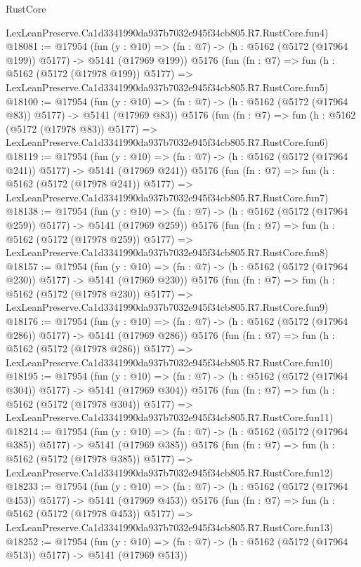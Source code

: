 \begin{lexlean}{RustCore}
\begin{coremodule}
    LexLeanPreserve.Ca1d3341990da937b7032e945f34cb805.R7.RustCore.fun4)
@18081 := @17954
    (fun (y : @10) => (fn : @7) -> (h : @5162 (@5172 (@17964 @199)) @5177) -> @5141 (@17969 @199))
    @5176
    (fun (fn : @7) =>
    fun (h : @5162 (@5172 (@17978 @199)) @5177) =>
    LexLeanPreserve.Ca1d3341990da937b7032e945f34cb805.R7.RustCore.fun5)
@18100 := @17954
    (fun (y : @10) => (fn : @7) -> (h : @5162 (@5172 (@17964 @83)) @5177) -> @5141 (@17969 @83))
    @5176
    (fun (fn : @7) =>
    fun (h : @5162 (@5172 (@17978 @83)) @5177) =>
    LexLeanPreserve.Ca1d3341990da937b7032e945f34cb805.R7.RustCore.fun6)
@18119 := @17954
    (fun (y : @10) => (fn : @7) -> (h : @5162 (@5172 (@17964 @241)) @5177) -> @5141 (@17969 @241))
    @5176
    (fun (fn : @7) =>
    fun (h : @5162 (@5172 (@17978 @241)) @5177) =>
    LexLeanPreserve.Ca1d3341990da937b7032e945f34cb805.R7.RustCore.fun7)
@18138 := @17954
    (fun (y : @10) => (fn : @7) -> (h : @5162 (@5172 (@17964 @259)) @5177) -> @5141 (@17969 @259))
    @5176
    (fun (fn : @7) =>
    fun (h : @5162 (@5172 (@17978 @259)) @5177) =>
    LexLeanPreserve.Ca1d3341990da937b7032e945f34cb805.R7.RustCore.fun8)
@18157 := @17954
    (fun (y : @10) => (fn : @7) -> (h : @5162 (@5172 (@17964 @230)) @5177) -> @5141 (@17969 @230))
    @5176
    (fun (fn : @7) =>
    fun (h : @5162 (@5172 (@17978 @230)) @5177) =>
    LexLeanPreserve.Ca1d3341990da937b7032e945f34cb805.R7.RustCore.fun9)
@18176 := @17954
    (fun (y : @10) => (fn : @7) -> (h : @5162 (@5172 (@17964 @286)) @5177) -> @5141 (@17969 @286))
    @5176
    (fun (fn : @7) =>
    fun (h : @5162 (@5172 (@17978 @286)) @5177) =>
    LexLeanPreserve.Ca1d3341990da937b7032e945f34cb805.R7.RustCore.fun10)
@18195 := @17954
    (fun (y : @10) => (fn : @7) -> (h : @5162 (@5172 (@17964 @304)) @5177) -> @5141 (@17969 @304))
    @5176
    (fun (fn : @7) =>
    fun (h : @5162 (@5172 (@17978 @304)) @5177) =>
    LexLeanPreserve.Ca1d3341990da937b7032e945f34cb805.R7.RustCore.fun11)
@18214 := @17954
    (fun (y : @10) => (fn : @7) -> (h : @5162 (@5172 (@17964 @385)) @5177) -> @5141 (@17969 @385))
    @5176
    (fun (fn : @7) =>
    fun (h : @5162 (@5172 (@17978 @385)) @5177) =>
    LexLeanPreserve.Ca1d3341990da937b7032e945f34cb805.R7.RustCore.fun12)
@18233 := @17954
    (fun (y : @10) => (fn : @7) -> (h : @5162 (@5172 (@17964 @453)) @5177) -> @5141 (@17969 @453))
    @5176
    (fun (fn : @7) =>
    fun (h : @5162 (@5172 (@17978 @453)) @5177) =>
    LexLeanPreserve.Ca1d3341990da937b7032e945f34cb805.R7.RustCore.fun13)
@18252 := @17954
    (fun (y : @10) => (fn : @7) -> (h : @5162 (@5172 (@17964 @513)) @5177) -> @5141 (@17969 @513))

\end{coremodule}
\end{lexlean}
